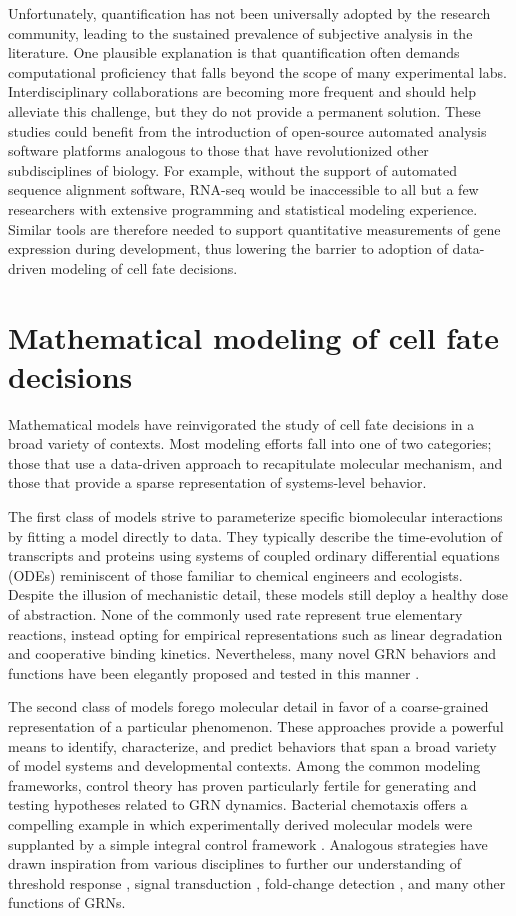 Unfortunately, quantification has not been universally adopted by the research community, leading to the sustained prevalence of subjective analysis in the literature. One plausible explanation is that quantification often demands computational proficiency that falls beyond the scope of many experimental labs. Interdisciplinary collaborations are becoming more frequent and should help alleviate this challenge, but they do not provide a permanent solution. These studies could benefit from the introduction of open-source automated analysis software platforms analogous to those that have revolutionized other subdisciplines of biology. For example, without the support of automated sequence alignment software, RNA-seq would be inaccessible to all but a few researchers with extensive programming and statistical modeling experience. Similar tools are therefore needed to support quantitative measurements of gene expression during development, thus lowering the barrier to adoption of data-driven modeling of cell fate decisions.

\section{Mathematical modeling of cell fate decisions}

Mathematical models have reinvigorated the study of cell fate decisions in a broad variety of contexts. Most modeling efforts fall into one of two categories; those that use a data-driven approach to recapitulate molecular mechanism, and those that provide a sparse representation of systems-level behavior. 

The first class of models strive to parameterize specific biomolecular interactions by fitting a model directly to data. They typically describe the time-evolution of transcripts and proteins using systems of coupled ordinary differential equations (ODEs) reminiscent of those familiar to chemical engineers and ecologists. Despite the illusion of mechanistic detail, these models still deploy a healthy dose of abstraction. None of the commonly used rate represent true elementary reactions, instead opting for empirical representations such as linear degradation and cooperative binding kinetics. Nevertheless, many novel GRN behaviors and functions have been elegantly proposed and tested in this manner \cite{Yu2008,Paulsen2011}. 

The second class of models forego molecular detail in favor of a coarse-grained representation of a particular phenomenon. These approaches provide a powerful means to identify, characterize, and predict behaviors that span a broad variety of model systems and developmental contexts. Among the common modeling frameworks, control theory has proven particularly fertile for generating and testing hypotheses related to GRN dynamics. Bacterial chemotaxis offers a compelling example in which experimentally derived molecular models were supplanted by a simple integral control framework \cite{Barkai1997,Alon1999,Yi2000}. Analogous strategies have drawn inspiration from various disciplines to further our understanding of threshold response \cite{Melen2005,Graham2010}, signal transduction \cite{Benziger2018}, fold-change detection \cite{Adler2018}, and many other functions of GRNs.

